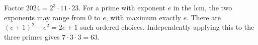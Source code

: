 Factor $2024=2^3\cdot11\cdot23$. For a prime with exponent $e$ in the lcm, the two exponents may range from 0 to $e$, with maximum exactly $e$. There are $(e+1)^2-e^2=2e+1$ such ordered choices. Independently applying this to the three primes gives $7\cdot3\cdot3=\boxed{63}$.
